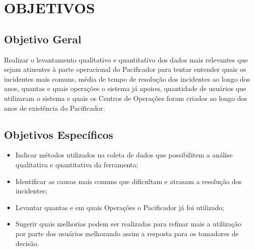% 
%


\chapter{OBJETIVOS}
\label{chap:objetivos}

\section{Objetivo Geral}
\label{sec:objetivogeral}

Realizar o levantamento qualitativo e quantitativo dos dados mais relevantes que sejam atinentes à parte operacional do Pacificador para tentar entender quais os incidentes mais comuns, média de tempo de resolução dos incidentes ao longo dos anos, quantas e quais operações o sistema já apoiou, quantidade de usuários que utilizaram o sistema e quais os Centros de Operações foram criados ao longo dos anos de existência do Pacificador.

\section{Objetivos Específicos}
\label{sec:objetivosespecificos}

\begin{itemize}
    \item Indicar métodos utilizados na coleta de dados que possibilitem a análise qualitativa e quantitativa  da ferramenta;
    \item Identificar as causas mais comuns que dificultam e atrasam a resolução dos incidentes;
    \item Levantar quantas e em quais Operações o Pacificador já foi utilizado;
    \item Sugerir quais melhorias podem ser realizadas para refinar mais a utilização por parte dos usuários melhorando assim a resposta para os tomadores de decisão.
\end{itemize}